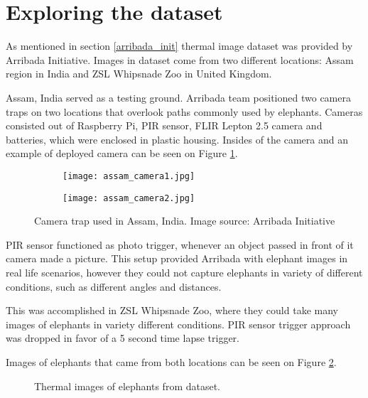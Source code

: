 \section{ Exploring the dataset} \label{exploring_dataset}

As mentioned in section \ref{arribada_init} thermal image dataset was provided by Arribada Initiative\cite{wildlabs-winners}\cite{arribada-assam}.
Images in dataset come from two different locations: Assam region in India and ZSL Whipsnade Zoo in United Kingdom.

Assam, India served as a testing ground.
Arribada team positioned two camera traps on two locations that overlook paths commonly used by elephants.
Cameras consisted out of Raspberry Pi, PIR sensor, FLIR Lepton 2.5 camera and batteries, which were enclosed in plastic housing.
Insides of the camera and an example of deployed camera can be seen on Figure \ref{assam_camera}.

\begin{figure}[ht]
    \begin{subfigure}{0.5\textwidth}
        \centering
        \texttt{[image: assam\_camera1.jpg]} 
    \end{subfigure}
    \begin{subfigure}{0.5\textwidth}
        \centering
        \texttt{[image: assam\_camera2.jpg]}
    \end{subfigure}

    \caption{Camera trap used in Assam, India. Image source: Arribada Initiative \cite{arribada-assam}}
    \label{assam_camera}
\end{figure}

PIR sensor functioned as photo trigger, whenever an object passed in front of it camera made a picture.
This setup provided Arribada with elephant images in real life scenarios, however they could not capture elephants in variety of different conditions, such as different angles and distances.

This was accomplished in ZSL Whipsnade Zoo, where they could take many images of elephants in variety different conditions\cite{dataset_collection}.
PIR sensor trigger approach was dropped in favor of a 5 second time lapse trigger.

Images of elephants that came from both locations can be seen on Figure \ref{four_elephants}.

\begin{figure}[ht]
    \centering
    \caption{Thermal images of elephants from dataset.}
    \label{four_elephants}
\end{figure}

